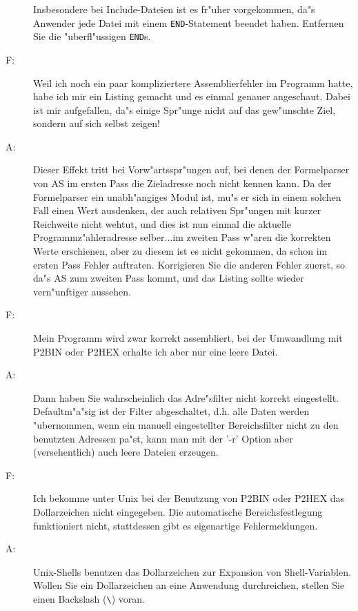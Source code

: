 \documentclass[12pt,a4paper,twoside]{report}
\newcommand{\tty}[1]{{\tt #1}}
\begin{document}
\begin{description}
{	  Insbesondere bei Include-Dateien ist es fr"uher vorgekommen, da"s
	  Anwender jede Datei mit einem \tty{END}-Statement beendet haben.
	  Entfernen Sie die "uberfl"ussigen \tty{END}s.}
\vspace{0.3cm}
\item[F:]{Weil ich noch ein paar kompliziertere Assemblierfehler im Programm
          hatte, habe ich mir ein Listing gemacht und es einmal genauer
          angeschaut.  Dabei ist mir aufgefallen, da"s einige Spr"unge nicht
          auf das gew"unschte Ziel, sondern auf sich selbst zeigen!}
\item[A:]{Dieser Effekt tritt bei Vorw"artsspr"ungen auf, bei denen der
          Formelparser von AS im ersten Pass die Zieladresse noch nicht kennen
          kann.  Da der Formelparser ein unabh"angiges Modul ist, mu"s er sich
          in einem solchen Fall einen Wert ausdenken, der auch relativen
          Spr"ungen mit kurzer Reichweite nicht wehtut, und dies ist nun
          einmal die aktuelle Programmz"ahleradresse selber...im zweiten Pass
          w"aren die korrekten Werte erschienen, aber zu diesem ist es nicht
          gekommen, da schon im ersten Pass Fehler auftraten.  Korrigieren
          Sie die anderen Fehler zuerst, so da"s AS zum zweiten Pass kommt,
          und das Listing sollte wieder vern"unftiger aussehen.}
\vspace{0.3cm}
\item[F:]{Mein Programm wird zwar korrekt assembliert, bei der Umwandlung
          mit P2BIN oder P2HEX erhalte ich aber nur eine leere Datei.}
\item[A:]{Dann haben Sie wahrscheinlich das Adre"s\-fil\-ter nicht korrekt
          eingestellt.  De\-faul\-tm"a"sig ist der Filter abgeschaltet, d.h.
          alle Daten werden "ubernommen, wenn ein manuell eingestellter
          Bereichsfilter nicht zu den benutzten Adressen pa"st, kann man
          mit der '-r' Option aber (versehentlich) auch leere Dateien
          erzeugen.}
\vspace{0.3cm}
\item[F:]{Ich bekomme unter Unix bei der Benutzung von P2BIN oder P2HEX
          das Dollarzeichen nicht eingegeben.  Die automatische
          Bereichsfestlegung funktioniert nicht, stattdessen gibt es
          eigenartige Fehlermeldungen.}
\item[A:]{Unix-Shells benutzen das Dollarzeichen zur Expansion von
          Shell-Variablen.  Wollen Sie ein Dollarzeichen an eine Anwendung
          durchreichen, stellen Sie einen Backslash (\verb!\!) voran.
}
\end{description}
\end{document}
